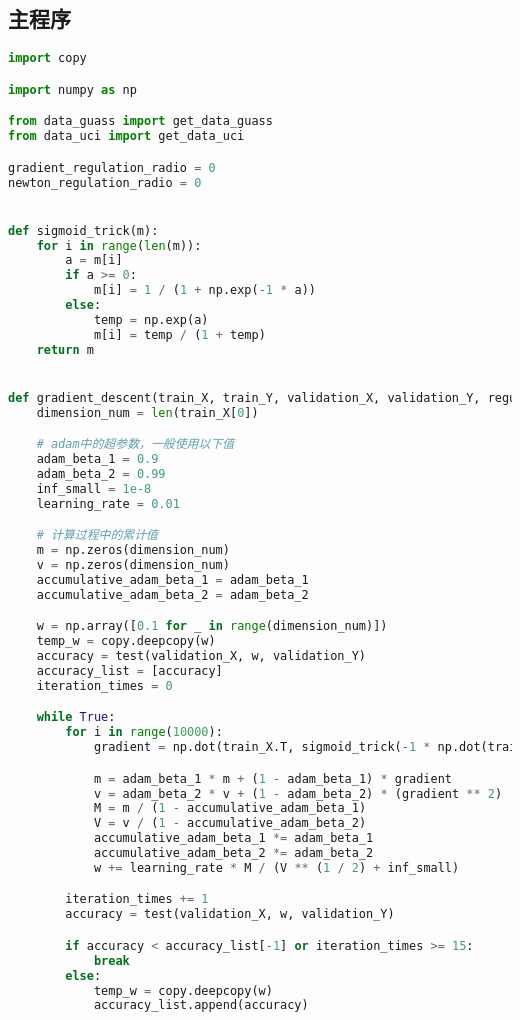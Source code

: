 \documentclass[withoutpreface,bwprint]{cumcmthesis}
\begin{document}
\newpage
\begin{appendix}
\section{主程序}
\begin{lstlisting}[language=python]
import copy

import numpy as np

from data_guass import get_data_guass
from data_uci import get_data_uci

gradient_regulation_radio = 0
newton_regulation_radio = 0


def sigmoid_trick(m):
    for i in range(len(m)):
        a = m[i]
        if a >= 0:
            m[i] = 1 / (1 + np.exp(-1 * a))
        else:
            temp = np.exp(a)
            m[i] = temp / (1 + temp)
    return m


def gradient_descent(train_X, train_Y, validation_X, validation_Y, regulation_radio=0.0):
    dimension_num = len(train_X[0])

    # adam中的超参数，一般使用以下值
    adam_beta_1 = 0.9
    adam_beta_2 = 0.99
    inf_small = 1e-8
    learning_rate = 0.01

    # 计算过程中的累计值
    m = np.zeros(dimension_num)
    v = np.zeros(dimension_num)
    accumulative_adam_beta_1 = adam_beta_1
    accumulative_adam_beta_2 = adam_beta_2

    w = np.array([0.1 for _ in range(dimension_num)])
    temp_w = copy.deepcopy(w)
    accuracy = test(validation_X, w, validation_Y)
    accuracy_list = [accuracy]
    iteration_times = 0

    while True:
        for i in range(10000):
            gradient = np.dot(train_X.T, sigmoid_trick(-1 * np.dot(train_X, w)) - train_Y) - regulation_radio * w

            m = adam_beta_1 * m + (1 - adam_beta_1) * gradient
            v = adam_beta_2 * v + (1 - adam_beta_2) * (gradient ** 2)
            M = m / (1 - accumulative_adam_beta_1)
            V = v / (1 - accumulative_adam_beta_2)
            accumulative_adam_beta_1 *= adam_beta_1
            accumulative_adam_beta_2 *= adam_beta_2
            w += learning_rate * M / (V ** (1 / 2) + inf_small)

        iteration_times += 1
        accuracy = test(validation_X, w, validation_Y)

        if accuracy < accuracy_list[-1] or iteration_times >= 15:
            break
        else:
            temp_w = copy.deepcopy(w)
            accuracy_list.append(accuracy)


\end{lstlisting}
\end{appendix}
\end{document}
